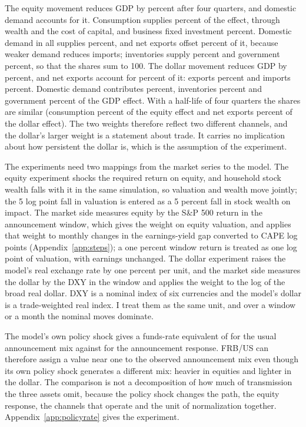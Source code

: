 \documentclass[11pt]{article}
\begin{document}
The equity movement reduces GDP by  percent after four quarters, and domestic demand accounts for it. Consumption supplies  percent of the effect, through wealth and the cost of capital, and business fixed investment  percent. Domestic demand in all supplies  percent, and net exports offset  percent of it, because weaker demand reduces imports; inventories supply  percent and government  percent, so that the shares sum to 100. The dollar movement reduces GDP by  percent, and net exports account for  percent of it: exports  percent and imports  percent. Domestic demand contributes  percent, inventories  percent and government  percent of the GDP effect. With a half-life of four quarters the shares are similar (consumption  percent of the equity effect and net exports  percent of the dollar effect). The two weights therefore reflect two different channels, and the dollar's larger weight is a statement about trade. It carries no implication about how persistent the dollar is, which is the assumption of the experiment.

The experiments need two mappings from the market series to the model. The equity experiment shocks the required return on equity, and household stock wealth falls with it in the same simulation, so valuation and wealth move jointly; the 5 log point fall in valuation is entered as a 5 percent fall in stock wealth on impact. The market side measures equity by the S\&P 500 return in the announcement window, which gives the weight on equity valuation, and applies that weight to monthly changes in the earnings-yield gap converted to CAPE log points (Appendix~\ref{app:steps}); a one percent window return is treated as one log point of valuation, with earnings unchanged. The dollar experiment raises the model's real exchange rate by one percent per unit, and the market side measures the dollar by the DXY in the window and applies the weight to the log of the broad real dollar. DXY is a nominal index of six currencies and the model's dollar is a trade-weighted real index. I treat them as the same unit, and over a window or a month the nominal moves dominate.

The model's own policy shock gives a funds-rate equivalent of  for the usual announcement mix against  for the announcement response. FRB/US can therefore assign a value near one to the observed announcement mix even though its own policy shock generates a different mix: heavier in equities and lighter in the dollar. The comparison is not a decomposition of how much of transmission the three assets omit, because the policy shock changes the path, the equity response, the channels that operate and the unit of normalization together. Appendix~\ref{app:policyrate} gives the experiment.
\end{document}
